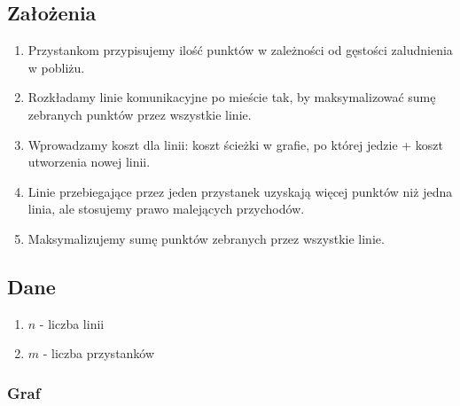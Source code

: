 \documentclass[12pt,a4paper,openright]{mwrep}
\begin{document}
\subsection{Założenia}

\begin{enumerate}
    \item Przystankom przypisujemy ilość punktów w zależności od gęstości zaludnienia w pobliżu.
    \item Rozkładamy linie komunikacyjne po mieście tak, by maksymalizować sumę zebranych punktów przez wszystkie linie.
    \item Wprowadzamy koszt dla linii: koszt ścieżki w grafie, po której jedzie + koszt utworzenia nowej linii.
    \item Linie przebiegające przez jeden przystanek uzyskają więcej punktów niż jedna linia, ale stosujemy prawo malejących przychodów.
    \item Maksymalizujemy sumę punktów zebranych przez wszystkie linie.
\end{enumerate}

\subsection{Dane}
\begin{enumerate}
    \item $n$ - liczba linii
    \item $m$ - liczba przystanków
\end{enumerate}

\subsubsection{Graf}
\end{document}
